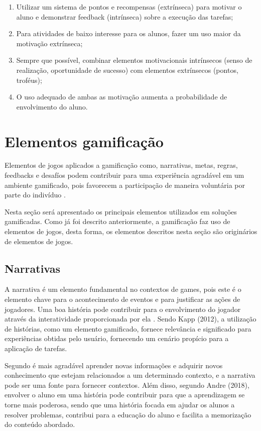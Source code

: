 \documentclass[
	12pt,				%
	oneside,			%
	a4paper,			%
	english,			%
	french,				%
	spanish,			%
	brazil,				%
	]{abntex2}
\begin{document}
\begin{enumerate}
\item Utilizar um sistema de pontos e recompensas (extrínseca) para motivar o aluno e demonstrar feedback (intrínseca) sobre a execução das tarefas;
\item Para atividades de baixo interesse para os alunos, fazer um uso maior da motivação extrínseca;
\item Sempre que possível, combinar elementos motivacionais intrínsecos (senso de realização, oportunidade de sucesso) com elementos extrínsecos (pontos, troféus);
\item O uso adequado de ambas as motivação aumenta a probabilidade de envolvimento do aluno.
\end{enumerate}
  
\section{Elementos gamificação}

Elementos de jogos aplicados a gamificação como, narrativas, metas, regras, feedbacks e desafíos podem contribuir para uma experiência agradável em um ambiente gamificado, pois favorecem a participação de maneira voluntária por parte do indivíduo \cite{busarello2016gamificaccao}.

Nesta seção será apresentado os principais elementos utilizados em soluções gamificadas. Como já foi descrito anteriormente, a gamificação faz uso de elementos de jogos, desta forma, os elementos descritos nesta seção são originários de elementos de jogos.

\subsection{Narrativas}

A narrativa é um elemento fundamental no contextos de games, pois este é o elemento chave para o acontecimento de eventos e para justificar as ações de jogadores. Uma boa história pode contribuir para o envolvimento do jogador através da interatividade proporcionada por ela  \cite{fardo2013gamificaccao}. Sendo Kapp (2012), a utilização de histórias, como um elemento gamificado, fornece relevância e significado para experiências obtidas pelo usuário, fornecendo um cenário propício para a aplicação de tarefas.

Segundo \citet{fardo2013gamificaccao} é mais agradável aprender novas informações e adquirir novos conhecimento que estejam relacionados a um determinado contexto, e a narrativa pode ser uma fonte para fornecer contextos. Além disso, segundo Andre (2018), envolver o aluno em uma história pode contribuir para que a aprendizagem se torne mais poderosa, sendo que uma história focada em ajudar os alunos a resolver problemas, contribui para a educação do aluno e facilita a memorização do conteúdo abordado.
\end{document}
